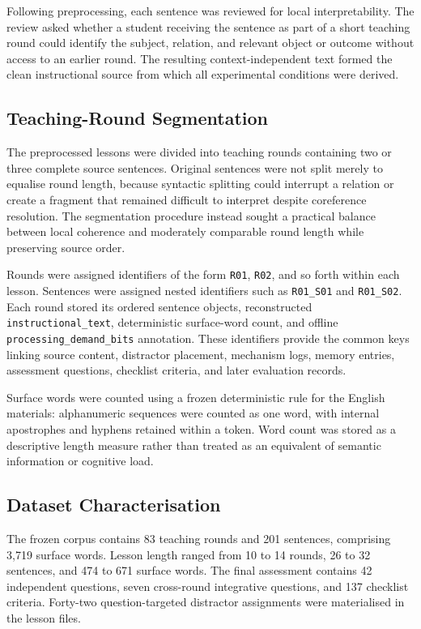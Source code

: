 Following preprocessing, each sentence was reviewed for local interpretability. The review asked whether a student receiving the sentence as part of a short teaching round could identify the subject, relation, and relevant object or outcome without access to an earlier round. The resulting context-independent text formed the clean instructional source from which all experimental conditions were derived.

\subsection{Teaching-Round Segmentation}
\label{subsec:teaching-round-segmentation}

The preprocessed lessons were divided into teaching rounds containing two or three complete source sentences. Original sentences were not split merely to equalise round length, because syntactic splitting could interrupt a relation or create a fragment that remained difficult to interpret despite coreference resolution. The segmentation procedure instead sought a practical balance between local coherence and moderately comparable round length while preserving source order.

Rounds were assigned identifiers of the form \texttt{R01}, \texttt{R02}, and so forth within each lesson. Sentences were assigned nested identifiers such as \texttt{R01\_S01} and \texttt{R01\_S02}. Each round stored its ordered sentence objects, reconstructed \texttt{instructional\_text}, deterministic surface-word count, and offline \texttt{processing\_demand\_bits} annotation. These identifiers provide the common keys linking source content, distractor placement, mechanism logs, memory entries, assessment questions, checklist criteria, and later evaluation records.

Surface words were counted using a frozen deterministic rule for the English materials: alphanumeric sequences were counted as one word, with internal apostrophes and hyphens retained within a token. Word count was stored as a descriptive length measure rather than treated as an equivalent of semantic information or cognitive load.

\subsection{Dataset Characterisation}
\label{subsec:dataset-characterisation}

The frozen corpus contains 83 teaching rounds and 201 sentences, comprising 3,719 surface words. Lesson length ranged from 10 to 14 rounds, 26 to 32 sentences, and 474 to 671 surface words. The final assessment contains 42 independent questions, seven cross-round integrative questions, and 137 checklist criteria. Forty-two question-targeted distractor assignments were materialised in the lesson files.

